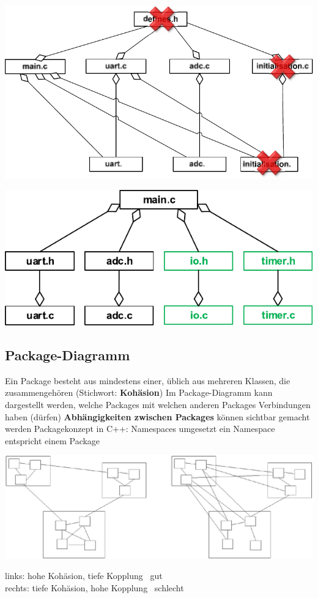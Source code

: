 \begin{minipage}[t]{0.48\columnwidth}
    \includegraphics[width=\columnwidth, align=t]{images/modulaisierung_bsp_schlecht.pdf}
\end{minipage}
\hfill
\begin{minipage}[t]{0.48\columnwidth}
    \includegraphics[width=\columnwidth, align=t]{images/modulaisierung_bsp_gut.pdf}
\end{minipage}


\subsection{Package-Diagramm}

\begin{outline}
    \1 Ein Package besteht aus mindestens einer, üblich aus mehreren Klassen, die zusammengehören (Stichwort: \textbf{Kohäsion})
    \1 Im Package-Diagramm kann dargestellt werden, welche Packages mit welchen anderen Packages Verbindungen haben (dürfen) 
        \2 \textbf{Abhängigkeiten zwischen Packages} können sichtbar gemacht werden
    \1 Packagekonzept in C++: Namespaces umgesetzt
        \2 ein Namespace entspricht einem Package
\end{outline}



\begin{center}
    \includegraphics[width=0.9\columnwidth]{images/modulaisierung_bsp.png}
\end{center}

links: hohe Kohäsion, tiefe Kopplung \textrightarrow\ gut \\
rechts: tiefe Kohäsion, hohe Kopplung \textrightarrow\ schlecht


